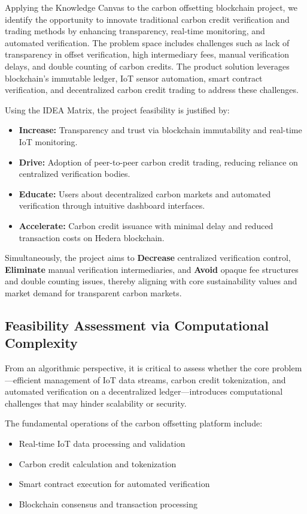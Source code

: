 \documentclass[oneside,a4paper,12pt]{book}
\begin{document}
\begin{appendices}
Applying the Knowledge Canvas to the carbon offsetting blockchain project, we identify the opportunity to innovate traditional carbon credit verification and trading methods by enhancing transparency, real-time monitoring, and automated verification. The problem space includes challenges such as lack of transparency in offset verification, high intermediary fees, manual verification delays, and double counting of carbon credits. The product solution leverages blockchain's immutable ledger, IoT sensor automation, smart contract verification, and decentralized carbon credit trading to address these challenges.

Using the IDEA Matrix, the project feasibility is justified by:

\begin{itemize}
\item \textbf{Increase:} Transparency and trust via blockchain immutability and real-time IoT monitoring.
\item \textbf{Drive:} Adoption of peer-to-peer carbon credit trading, reducing reliance on centralized verification bodies.
\item \textbf{Educate:} Users about decentralized carbon markets and automated verification through intuitive dashboard interfaces.
\item \textbf{Accelerate:} Carbon credit issuance with minimal delay and reduced transaction costs on Hedera blockchain.
\end{itemize}

Simultaneously, the project aims to \textbf{Decrease} centralized verification control, \textbf{Eliminate} manual verification intermediaries, and \textbf{Avoid} opaque fee structures and double counting issues, thereby aligning with core sustainability values and market demand for transparent carbon markets.

\subsection{Feasibility Assessment via Computational Complexity}
From an algorithmic perspective, it is critical to assess whether the core problem—efficient management of IoT data streams, carbon credit tokenization, and automated verification on a decentralized ledger—introduces computational challenges that may hinder scalability or security.

The fundamental operations of the carbon offsetting platform include:
\begin{itemize}
\item Real-time IoT data processing and validation
\item Carbon credit calculation and tokenization
\item Smart contract execution for automated verification
\item Blockchain consensus and transaction processing
\end{itemize}


\end{appendices}
\end{document}
